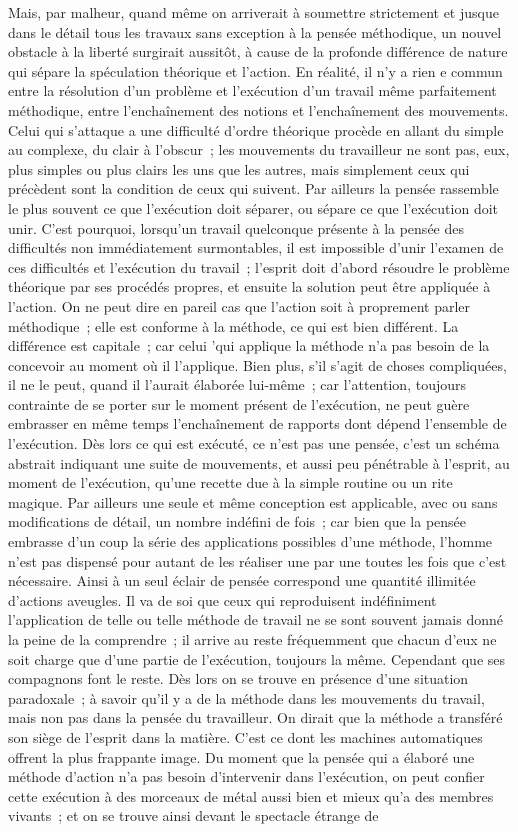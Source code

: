 \documentclass[french,twoside]{book} %
\begin{document}
Mais, par malheur, quand même on arriverait à soumettre strictement et jusque dans le détail tous les travaux sans exception à la pensée méthodique, un nouvel obstacle à la liberté surgirait aussitôt, à cause de la profonde différence de nature qui sépare la spéculation théorique et l'action. En réalité, il n'y a rien e commun entre la résolution d'un problème et l'exécution d'un travail même parfaitement méthodique, entre l'enchaînement des notions et l'enchaînement des mouvements. Celui qui s'attaque a une difficulté d'ordre théorique procède en allant du simple au complexe, du clair à l'obscur ; les mouvements du travailleur ne sont pas, eux, plus simples ou plus clairs les uns que les autres, mais simplement ceux qui précèdent sont la condition de ceux qui suivent. Par ailleurs la pensée rassemble le plus souvent ce que l'exécution doit séparer, ou sépare ce que l'exécution doit unir. C'est pourquoi, lorsqu'un travail quelconque présente à la pensée des difficultés non immédiatement surmontables, il est impossible d'unir l'examen de ces difficultés et l'exécution du travail ; l'esprit doit d'abord résoudre le problème théorique par ses procédés propres, et ensuite la solution peut être appliquée à l'action. On ne peut dire en pareil cas que l'action soit à proprement parler méthodique ; elle est conforme à la méthode, ce qui est bien différent. La différence est capitale ; car celui 'qui applique la méthode n'a pas besoin de la concevoir au moment où il l'applique. Bien plus, s'il s'agit de choses compliquées, il ne le peut, quand il l'aurait élaborée lui-même ; car l'attention, toujours contrainte de se porter sur le moment présent de l'exécution, ne peut guère embrasser en même temps l'enchaînement de rapports dont dépend l'ensemble de l'exécution. Dès lors ce qui est exécuté, ce n'est pas une pensée, c'est un schéma abstrait indiquant une suite de mouvements, et aussi peu pénétrable à l’esprit, au moment de l'exécution, qu'une recette due à la simple routine ou un rite magique. Par ailleurs une seule et même conception est applicable, avec ou sans modifications de détail, un nombre indéfini de fois ; car bien que la pensée embrasse d'un coup la série des applications possibles d'une méthode, l'homme n'est pas dispensé pour autant de les réaliser une par une toutes les fois que c'est nécessaire. Ainsi à un seul éclair de pensée correspond une quantité illimitée d'actions aveugles. Il va de soi que ceux qui reproduisent indéfiniment l'application de telle ou telle méthode de travail ne se sont souvent jamais donné la peine de la comprendre ; il arrive au reste fréquemment que chacun d'eux ne soit charge que d'une partie de l'exécution, toujours la même. Cependant que ses compagnons font le reste. Dès lors on se trouve en présence d'une situation paradoxale ; à savoir qu'il y a de la méthode dans les mouvements du travail, mais non pas dans la pensée du travailleur. On dirait que la méthode a transféré son siège de l'esprit dans la matière. C'est ce dont les machines automatiques offrent la plus frappante image. Du moment que la pensée qui a élaboré une méthode d'action n'a pas besoin d'intervenir dans l'exécution, on peut confier cette exécution à des morceaux de métal aussi bien et mieux qu'a des membres vivants ; et on se trouve ainsi devant le spectacle étrange de 
\end{document}
